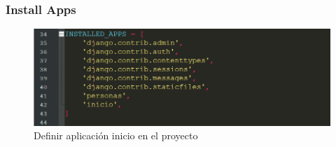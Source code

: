\documentclass{article}
\begin{document}

  \subsubsection{Install Apps}
  \begin{figure}[H]
    \centering
    \includegraphics[width=1\textwidth, keepaspectratio]{img/inicio.png}  
    \caption{Definir aplicación inicio en el proyecto}
  \end{figure}
  
\end{document}
